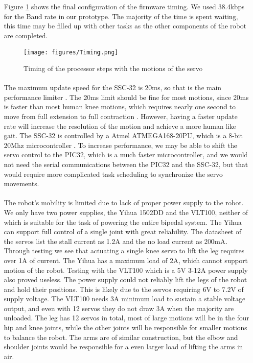\documentclass[titlepage,letterpaper,12pt]{article}
\begin{document}
Figure \ref{timing} shows the final configuration of the firmware timing. We
used 38.4kbps for the Baud rate in our prototype. The majority of the time is
spent waiting, this time may be filled up with other tasks as the other
components of the robot are completed.

\begin{figure}
    \centering
    \texttt{[image: figures/Timing.png]}
    \caption{Timing of the processor steps with the motions of the servo}
    \label{timing}
\end{figure}

\paragraph{}The maximum update speed for the SSC-32 is 20ms, so that is the main performance
limiter \cite{lynxmaxspeed}. The 20ms limit should be fine for most motions,
since 20ms is faster than most human knee motions, which requires nearly one
second to move from full extension to full contraction
\cite{williamson2001detecting}. However, having a faster update rate will
increase the resolution of the motion and achieve a more human like gait. The
SSC-32 is controlled by a Atmel ATMEGA168-20PU, which is a 8-bit 20Mhz
microcontroller \cite{Atmega168data}. To increase performance, we may be able to
shift the servo control to the PIC32, which is a much faster microcontroller,
and we would not need the serial communications between the PIC32 and the
SSC-32, but that would require more complicated task scheduling to synchronize
the servo movements.

\paragraph{}The robot's mobility is limited due to lack of
proper power supply to the robot. We only have two power supplies, the
Yihua 1502DD and the VLT100, neither of which is suitable for the task of
powering the entire bipedal system. The Yihua can support full control
of a single joint with great reliability. The datasheet of the servos list the
stall current as 1.2A and the no load current as 200mA. Through testing we see
that actuating a single knee servo to lift the leg requires over 1A of current.
The Yihua has a maximum load of 2A, which cannot support motion of the robot.
Testing with the VLT100 which is a 5V 3-12A power supply also proved useless.
The power supply could not reliably lift the legs of the robot and hold their
positions. This is likely due to the servos requiring 6V to 7.2V of supply
voltage. The VLT100 needs 3A minimum load to sustain a stable voltage output,
and even with 12 servos they do not draw 3A when the majority are unloaded. The
leg has 12 servos in total, most of large motions will be in the four hip and
knee joints, while the other joints will be responsible for smaller motions to
balance the robot.  The arms are of similar construction, but the elbow and
shoulder joints would be responsible for a even larger load of lifting the arms
in air.
\end{document}
